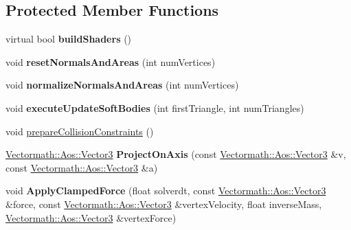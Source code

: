 \subsection*{Protected Member Functions}
\begin{DoxyCompactItemize}
\item 
\hypertarget{classbt_open_c_l_soft_body_solver_abf250e2e3a245d1a4ab25017b1c99292}{virtual bool {\bfseries build\+Shaders} ()}\label{classbt_open_c_l_soft_body_solver_abf250e2e3a245d1a4ab25017b1c99292}

\item 
\hypertarget{classbt_open_c_l_soft_body_solver_a4de74e7bf2cd5f5a1dee373ded831844}{void {\bfseries reset\+Normals\+And\+Areas} (int num\+Vertices)}\label{classbt_open_c_l_soft_body_solver_a4de74e7bf2cd5f5a1dee373ded831844}

\item 
\hypertarget{classbt_open_c_l_soft_body_solver_aa96d60579ded5de8db6840ff09989b7d}{void {\bfseries normalize\+Normals\+And\+Areas} (int num\+Vertices)}\label{classbt_open_c_l_soft_body_solver_aa96d60579ded5de8db6840ff09989b7d}

\item 
\hypertarget{classbt_open_c_l_soft_body_solver_af4d900b86735ba975e04cf5111aa1e60}{void {\bfseries execute\+Update\+Soft\+Bodies} (int first\+Triangle, int num\+Triangles)}\label{classbt_open_c_l_soft_body_solver_af4d900b86735ba975e04cf5111aa1e60}

\item 
void \hyperlink{classbt_open_c_l_soft_body_solver_a4c04cb2b16b762c4768304218c664470}{prepare\+Collision\+Constraints} ()
\item 
\hypertarget{classbt_open_c_l_soft_body_solver_a3a0f578011b93e94ac43a86387585a13}{\hyperlink{class_vectormath_1_1_aos_1_1_vector3}{Vectormath\+::\+Aos\+::\+Vector3} {\bfseries Project\+On\+Axis} (const \hyperlink{class_vectormath_1_1_aos_1_1_vector3}{Vectormath\+::\+Aos\+::\+Vector3} \&v, const \hyperlink{class_vectormath_1_1_aos_1_1_vector3}{Vectormath\+::\+Aos\+::\+Vector3} \&a)}\label{classbt_open_c_l_soft_body_solver_a3a0f578011b93e94ac43a86387585a13}

\item 
\hypertarget{classbt_open_c_l_soft_body_solver_acc300cbf275db4285f6337552f41a0b9}{void {\bfseries Apply\+Clamped\+Force} (float solverdt, const \hyperlink{class_vectormath_1_1_aos_1_1_vector3}{Vectormath\+::\+Aos\+::\+Vector3} \&force, const \hyperlink{class_vectormath_1_1_aos_1_1_vector3}{Vectormath\+::\+Aos\+::\+Vector3} \&vertex\+Velocity, float inverse\+Mass, \hyperlink{class_vectormath_1_1_aos_1_1_vector3}{Vectormath\+::\+Aos\+::\+Vector3} \&vertex\+Force)}\label{classbt_open_c_l_soft_body_solver_acc300cbf275db4285f6337552f41a0b9}


\end{DoxyCompactItemize}

